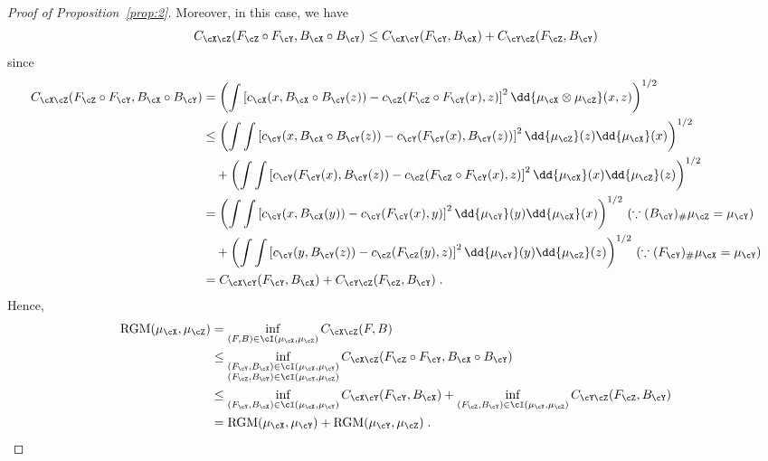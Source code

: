 \documentclass[11pt]{article}
\begin{document}
\begin{proof}[Proof of Proposition~\ref{prop:2}]
	Moreover, in this case, we have
	\begin{equation*}
		C_{\cX \cZ}(F_{\cZ} \circ F_{\cY}, B_{\cX} \circ B_{\cY})
		\le
		C_{\cX \cY}(F_{\cY}, B_{\cX})
		+
		C_{\cY \cZ}(F_{\cZ}, B_{\cY})
	\end{equation*}
	since
	\begin{equation*}
		\begin{split}
			C_{\cX \cZ}(F_{\cZ} \circ F_{\cY}, B_{\cX} \circ B_{\cY})
			&= \left(\int \left[c_{\cX}(x, B_{\cX} \circ B_{\cY}(z)) - c_{\cZ}(F_{\cZ} \circ F_{\cY}(x), z)\right]^2 \dd{\mu_{\cX} \otimes \mu_{\cZ}}(x, z)\right)^{1/2} \\
			&\le
			\left(\int \int \left[c_{\cY}(x, B_{\cX} \circ B_{\cY}(z)) - c_{\cY}(F_{\cY}(x), B_{\cY}(z))\right]^2 \dd{\mu_{\cZ}}(z) \dd{\mu_{\cX}}(x)\right)^{1/2} \\
			&\quad  +
			\left(\int \int \left[c_{\cY}(F_{\cY}(x), B_{\cY}(z)) - c_{\cZ}(F_{\cZ} \circ F_{\cY}(x), z)\right]^2 \dd{\mu_{\cX}}(x) \dd{\mu_{\cZ}}(z)\right)^{1/2} \\
			& =
			\left(\int \int \left[c_{\cY}(x, B_{\cX}(y)) - c_{\cY}(F_{\cY}(x), y)\right]^2 \dd{\mu_{\cY}}(y) \dd{\mu_{\cX}}(x)\right)^{1/2} \, (\because (B_{\cY})_{\#} \mu_{\cZ} = \mu_{\cY})\\
			&\quad  +
			\left(\int \int \left[c_{\cY}(y, B_{\cY}(z)) - c_{\cZ}(F_{\cZ}(y), z)\right]^2 \dd{\mu_{\cY}}(y) \dd{\mu_{\cZ}}(z)\right)^{1/2} \, (\because (F_{\cY})_{\#}\mu_{\cX} = \mu_{\cY}) \\
			& =
			C_{\cX \cY}(F_{\cY}, B_{\cX})
			+
			C_{\cY \cZ}(F_{\cZ}, B_{\cY})\;.
		\end{split}
	\end{equation*}
	Hence,
	\begin{equation*}
		\begin{split}
			\mathrm{RGM}(\mu_{\cX}, \mu_{\cZ})
			&= \inf_{(F, B) \in \cI(\mu_{\cX}, \mu_{\cZ})} C_{\cX \cZ}(F, B) \\
			&\le \inf_{\substack{(F_{\cY}, B_{\cX}) \in \cI(\mu_{\cX}, \mu_{\cY}) \\ (F_{\cZ}, B_{\cY}) \in \cI(\mu_{\cY}, \mu_{\cZ})}} C_{\cX \cZ}(F_{\cZ} \circ F_{\cY}, B_{\cX} \circ B_{\cY}) \\
			&\le \inf_{(F_{\cY}, B_{\cX}) \in \cI(\mu_{\cX}, \mu_{\cY})} C_{\cX \cY}(F_{\cY}, B_{\cX}) + \inf_{(F_{\cZ}, B_{\cY}) \in \cI(\mu_{\cY}, \mu_{\cZ})} C_{\cY \cZ}(F_{\cZ}, B_{\cY}) \\
			& = \mathrm{RGM}(\mu_{\cX}, \mu_{\cY}) + \mathrm{RGM}(\mu_{\cY}, \mu_{\cZ})\;.
		\end{split}
	\end{equation*}
\end{proof}
\end{document}
